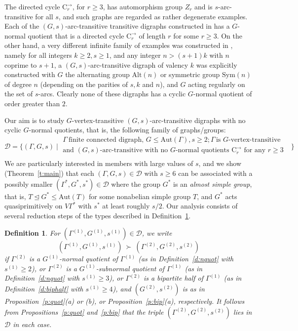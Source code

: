 \documentclass[11pt]{amsart}
\newtheorem{definition}[theorem]{Definition}
\newcommand{\Aut}{\mathrm{Aut}}
\newcommand{\C}{{\mathrm{C}}}
\newcommand\DD{{\mathscr{D}}}
\newcommand{\Sym}{\mathrm{Sym}}
\newcommand{\Alt}{\mathrm{Alt}}
\begin{document}
The directed cycle $\C^{\to}_r$, for $r\geqslant3$, has automorphism group $Z_r$ and is $s$-arc-transitive for all $s$, and such graphs are regarded as rather degenerate examples.  
Each of the $(G,s)$-arc-transitive transitive digraphs constructed in \cite[Definition 2.6, Theorem 2,8]{Praeger} has a $G$-normal quotient that is a directed cycle $\C^{\to}_r$ of length $r$ for some $r\geq3$. On the other hand, a very different infinite family of examples was constructed in \cite[Theorem 1]{CLP}, namely for all integers $k\geq 2, s\geq 1$, and any integer $n>(s+1)k$ with $n$ coprime to $s+1$, a $(G,s)$-arc-transitive digraph of valency $k$ was explicitly constructed with $G$ the alternating group $\Alt(n)$ or symmetric group $\Sym(n)$ of degree $n$ (depending on the parities of $s, k$ and $n$), and $G$ acting regularly on the set of $s$-arcs. Clearly none of these digraphs has a cyclic $G$-normal quotient of order greater than $2$.  

Our aim is to study $G$-vertex-transitive $(G,s)$-arc-transitive digraphs with no cyclic $G$-normal quotients, that is, the following family of graphs/groups: 
\begin{equation}\label{e:family}
    \DD = \big\{ (\Gamma, G, s) \mid \begin{array}{l}
         \Gamma \ \mbox{finite connected digraph, } G\leq \Aut(\Gamma), s\geqslant 2; \Gamma\, \mbox{is $G$-vertex-transitive}  \\
          \mbox{and $(G,s)$-arc-transitive with no $G$-normal quotients $\C_r^\to$ for any $r\geqslant3$ }\\
    \end{array}
   \big\}
\end{equation}
We are particularly interested in members with large values of $s$, and we show (Theorem~\ref{t:main}) that each $(\Gamma, G, s)\in\DD$ with $s\geqslant6$ can be associated with a possibly smaller $(\Gamma^*, G^*, s^*)\in\DD$ where the group $G^*$ is an \emph{almost simple group}, that is, $T\unlhd G^*\leqslant \Aut(T)$ for some nonabelian simple group $T$, and $G^*$ acts quasiprimitively on $V\Gamma^*$ with $s^*$ at least  roughly $s/2$. Our analysis consists of several reduction steps of the types described in Definition~\ref{d:reln}. 

\begin{definition}\label{d:reln}
    {\rm
    For $ (\Gamma^{(1)},G^{(1)},s^{(1)})\in\DD$, we write  
    \[ %
    (\Gamma^{(1)},G^{(1)},s^{(1)}) \ \succ\   (\Gamma^{(2)},G^{(2)},s^{(2)})
    \]
if $\Gamma^{(2)}$ is a $G^{(1)}$-normal quotient of  $\Gamma^{(1)}$ (as in Definition~\ref{d:nquot} with $s^{(1)}\geq 2$), or $\Gamma^{(2)}$ is a  $G^{(1)}$-subnormal  quotient of  $\Gamma^{(1)}$ (as in Definition~\ref{d:nquot}  with $s^{(1)}\geq 3$),  or $\Gamma^{(2)}$ is a bipartite half of  $\Gamma^{(1)}$ (as in Definition~\ref{d:biphalf} with $s^{(1)}\geq 4$), and $(G^{(2)},s^{(2)})$ is as in Proposition~\ref{p:quot}(a) or (b), or Proposition~\ref{p:bip}(a), respectively. It follows from Propositions~\ref{p:quot} and~\ref{p:bip} that the triple $(\Gamma^{(2)},G^{(2)},s^{(2)})$ lies in $\DD$ in each case.
    }
\end{definition}
\end{document}
